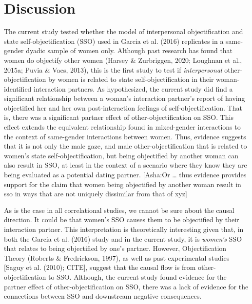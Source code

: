 \documentclass[man]{apa6}
\begin{document}
\section{Discussion}\label{discussion}

The current study tested whether the model of interpersonal
objectification and state self-objectification (SSO) used in Garcia et
al. (2016) replicates in a same-gender dyadic sample of women only.
Although past research has found that women do objectify other women
(Harsey \& Zurbriggen, 2020; Loughnan et al., 2015a; Puvia \& Vaes,
2013), this is the first study to test if \emph{interpersonal}
other-objectification by women is related to state self-objectification
in their woman-identified interaction partners. As hypothesized, the
current study did find a significant relationship between a woman's
interaction partner's report of having objectified her and her own
post-interaction feelings of self-objectification. That is, there was a
significant partner effect of other-objectification on SSO. This effect
extends the equivalent relationship found in mixed-gender interactions
to the context of same-gender interactions between women. Thus, evidence
suggests that it is not only the male gaze, and male
other-objectification that is related to women's state
self-objectification, but being objectified by another woman can also
result in SSO, at least in the context of a scenario where they know
they are being evaluated as a potential dating partner. {[}Asha:Or
\ldots{} thus evidence provides support for the claim that women being
objectified by another woman result in sso in ways that are not uniquely
dissimilar from that of xyz{]}

As is the case in all correlational studies, we cannot be sure about the
causal direction. It could be that women's SSO causes them to be
objectified by their interaction partner. This interpretation is
theoretically interesting given that, in both the Garcia et al. (2016)
study and in the current study, it is \emph{women's} SSO that relates to
being objectified by one's partner. However, Objectification Theory
(Roberts \& Fredrickson, 1997), as well as past experimental studies
{[}Saguy et al. (2010); CITE{]}, suggest that the causal flow is from
other-objectification to SSO. Although, the current study found evidence
for the partner effect of other-objectification on SSO, there was a lack
of evidence for the connections between SSO and downstream negative
consequences.
\end{document}
